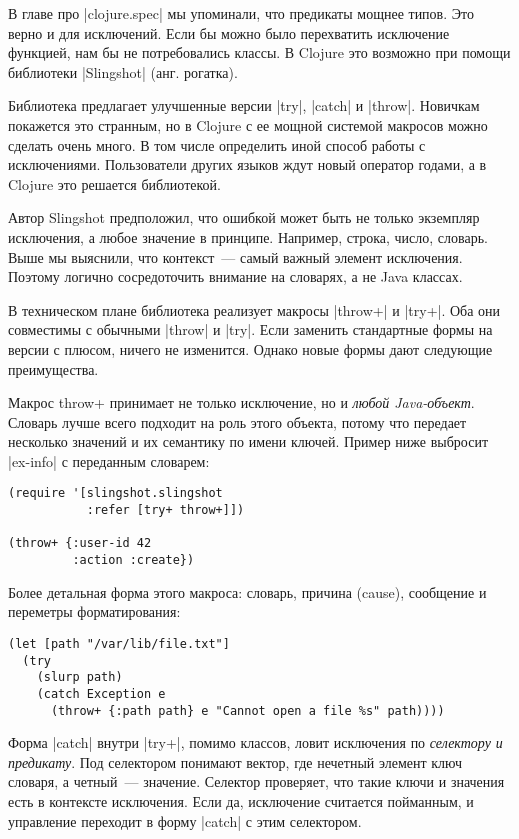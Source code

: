 В главе про \spverb|clojure.spec| мы упоминали, что предикаты мощнее типов. Это верно и
для исключений. Если бы можно было перехватить исключение функцией, нам бы не
потребовались классы. В Clojure это возможно при помощи библиотеки \spverb|Slingshot|
(анг. рогатка).

Библиотека предлагает улучшенные версии \spverb|try|, \spverb|catch| и \spverb|throw|. Новичкам
покажется это странным, но в Clojure с ее мощной системой макросов можно сделать
очень много. В том числе определить иной способ работы с исключениями.
Пользователи других языков ждут новый оператор годами, а в Clojure это решается
библиотекой.

Автор Slingshot предположил, что ошибкой может быть не только экземпляр
исключения, а любое значение в принципе. Например, строка, число, словарь. Выше
мы выяснили, что контекст~--- самый важный элемент исключения. Поэтому логично
сосредоточить внимание на словарях, а не Java классах.

В техническом плане библиотека реализует макросы \spverb|throw+| и \spverb|try+|. Оба они
совместимы с обычными \spverb|throw| и \spverb|try|. Если заменить стандартные формы на версии
с плюсом, ничего не изменится. Однако новые формы дают следующие преимущества.

Макрос throw+ принимает не только исключение, но и \emph{любой
Java-объект}. Словарь лучше всего подходит на роль этого объекта, потому что
передает несколько значений и их семантику по имени ключей. Пример ниже выбросит
\spverb|ex-info| с переданным словарем:

\begin{verbatim}
(require '[slingshot.slingshot
           :refer [try+ throw+]])

(throw+ {:user-id 42
         :action :create})
\end{verbatim}

Более детальная форма этого макроса: словарь, причина (cause), сообщение и
переметры форматирования:

\begin{verbatim}
(let [path "/var/lib/file.txt"]
  (try
    (slurp path)
    (catch Exception e
      (throw+ {:path path} e "Cannot open a file %s" path))))
\end{verbatim}

Форма \spverb|catch| внутри \spverb|try+|, помимо классов, ловит исключения по \emph{селектору и
предикату}. Под селектором понимают вектор, где нечетный элемент ключ словаря,
а четный~--- значение. Селектор проверяет, что такие ключи и значения есть в
контексте исключения. Если да, исключение считается пойманным, и управление
переходит в форму \spverb|catch| с этим селектором.

